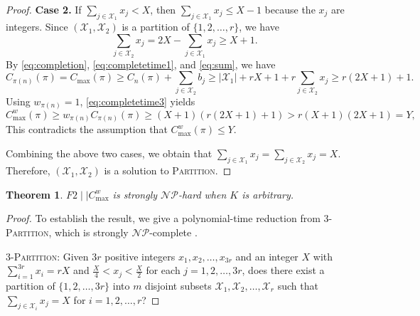 \documentclass[12pt]{article} \textheight=24.5cm \textwidth=16.5cm \parskip = 0.165cm
\newtheorem{theorem}{Theorem}[section]
\begin{document}
\begin{sloppypar}
\begin{proof}
            \textbf{Case 2.} If $\sum_{j \in \mathcal{X}_1} x_j < X$, then $\sum_{j \in \mathcal{X}_1} x_j \leq X-1$ because the $x_j$ are integers.
            Since $(\mathcal{X}_1, \mathcal{X}_2)$ is a partition of $\{1, 2, \ldots, r\}$, we have
            \begin{equation} \label{eq:sum}
                \sum_{j \in \mathcal{X}_2} x_j =2X-\sum_{j \in \mathcal{X}_1} x_j \geq X+1.
            \end{equation}
            By \cref{eq:completion}, \cref{eq:completetime1}, and \cref{eq:sum}, we have
            \begin{equation}\label{eq:completetime3}
                C_{\pi(n)}(\pi)=C_{\max}(\pi) \geq C_n(\pi)+\sum_{j \in \mathcal{X}_2} b_j \geq |\mathcal{X}_1| +r X + 1+ r \sum_{j \in \mathcal{X}_2} x_j \geq r (2X + 1)+1.
            \end{equation}
            Using $w_{\pi(n)}=1$, \cref{eq:completetime3} yields
            \begin{equation*}
                C_{\max}^w(\pi) \geq w_{\pi(n)} C_{\pi(n)}(\pi) \geq (X+1) (r(2X+1)+1) >r(X+1)(2X+1)=Y,
            \end{equation*}
            This contradicts the assumption that $C_{\max}^w(\pi) \leq Y$.
            
            Combining the above two cases, we obtain that $\sum_{j \in \mathcal{X}_1} x_j = \sum_{j \in \mathcal{X}_2} x_j= X$.
            Therefore, $(\mathcal{X}_1, \mathcal{X}_2)$ is a solution to \textsc{Partition}.
        \end{proof}
        
        \begin{theorem}\label{thm:snphard}
            $F2 \mid \mid C_{\max}^w$ is strongly $\mathcal{NP}$-hard when $K$ is arbitrary.
        \end{theorem}
        \begin{proof}
            To establish the result, we give a polynomial-time reduction from 3-\textsc{Partition}, which is strongly  $\mathcal{NP}$-complete \citep{GareyJohnson1979computer}.
            
            3-\textsc{Partition}: Given $3r$ positive integers $x_1, x_2, \ldots, x_{3r}$ and an integer $X$ with $\sum_{i=1}^{3r}x_i=rX$ and $\frac{X}{4} < x_j < \frac{X}{2}$ for each $j=1, 2, \ldots, 3r$, does there exist a partition of $\{1, 2, \ldots, 3r\}$ into $m$ disjoint subsets $\mathcal{X}_1, \mathcal{X}_2, \ldots, \mathcal{X}_r$ such that $\sum_{j \in \mathcal{X}_i} x_j=X$ for $i=1, 2, \ldots, r$?
            

\end{proof}
\end{sloppypar}
\end{document}
